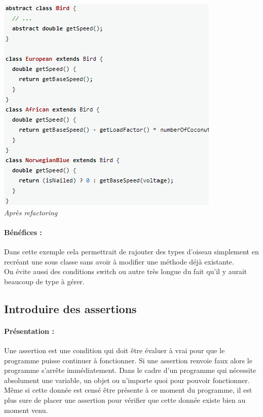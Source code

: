 \documentclass[a4paper,twoside,12pt,openright]{report}
\begin{document}
\begin{center}
\includegraphics[scale=1]{Image/ReplaceConditionalPoly2.png}\\
\itshape{Après refactoring \cite{ref5}}
\end{center}

\paragraph{Bénéfices :}
Dans cette exemple cela permettrait de rajouter des types d'oiseau simplement en recréant une sous classe sans avoir à modifier une méthode déjà existante.\\
On évite aussi des conditions switch ou autre très longue du fait qu'il y aurait beaucoup de type à gérer.\\

\subsection{Introduire des assertions}
\paragraph{Présentation :}
Une assertion est une condition qui doit être évaluer à vrai pour que le programme puisse continuer à fonctionner. Si une assertion renvoie faux alors le programme s'arrête immédiatement.
Dans le cadre d'un programme qui nécessite absolument une variable, un objet ou n'importe quoi pour pouvoir fonctionner. Même si cette donnée est censé être présente à ce moment du programme, il est plus sure de placer une assertion pour vérifier que cette donnée existe bien au moment venu.
\end{document}
